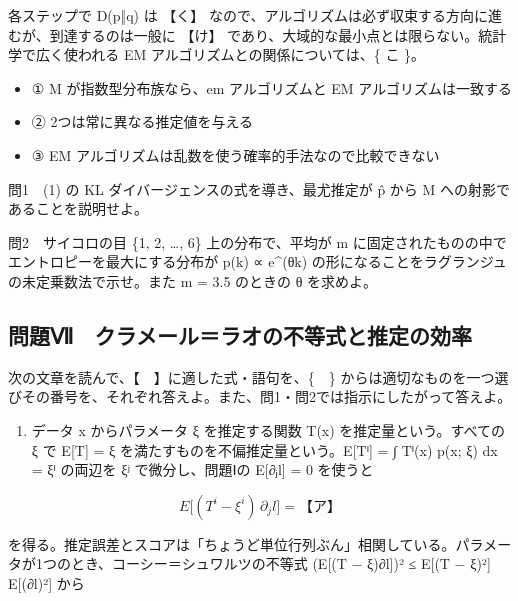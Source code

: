 \documentclass[
  10pt,
  a4paper,
]{article}
\providecommand{\tightlist}{%
  \setlength{\itemsep}{0pt}\setlength{\parskip}{0pt}}
\begin{document}
各ステップで D(p‖q) は 【く】
なので、アルゴリズムは必ず収束する方向に進むが、到達するのは一般に
【け】 であり、大域的な最小点とは限らない。統計学で広く使われる EM
アルゴリズムとの関係については、\{ こ \}。

\begin{itemize}
\tightlist
\item
  ① M が指数型分布族なら、em アルゴリズムと EM アルゴリズムは一致する
\item
  ② 2つは常に異なる推定値を与える
\item
  ③ EM アルゴリズムは乱数を使う確率的手法なので比較できない
\end{itemize}

問1　(1) の KL ダイバージェンスの式を導き、最尤推定が {\fallbackfont p̂}
から M への射影であることを説明せよ。

問2　サイコロの目 \{1, 2, \ldots, 6\} 上の分布で、平均が m
に固定されたものの中でエントロピーを最大にする分布が p(k) ∝ e\^{}(θk)
の形になることをラグランジュの未定乗数法で示せ。また m = 3.5 のときの θ
を求めよ。

\hypertarget{ux554fux984cux2176-ux30afux30e9ux30e1ux30fcux30ebux30e9ux30aaux306eux4e0dux7b49ux5f0fux3068ux63a8ux5b9aux306eux52b9ux7387}{%
\subsection{問題Ⅶ　クラメール＝ラオの不等式と推定の効率}\label{ux554fux984cux2176-ux30afux30e9ux30e1ux30fcux30ebux30e9ux30aaux306eux4e0dux7b49ux5f0fux3068ux63a8ux5b9aux306eux52b9ux7387}}

次の文章を読んで、【　】に適した式・語句を、\{　\}
からは適切なものを一つ選びその番号を、それぞれ答えよ。また、問1・問2では指示にしたがって答えよ。

\begin{enumerate}
\def\labelenumi{(\arabic{enumi})}
\tightlist
\item
  データ x からパラメータ ξ を推定する関数 T(x) を推定量という。すべての
  ξ で E{[}T{]} = ξ
  を満たすものを不偏推定量という。E{[}T{\fallbackfont ⁱ}{]} = ∫
  T{\fallbackfont ⁱ}(x) p(x; ξ) dx = ξ{\fallbackfont ⁱ} の両辺を
  ξ{\fallbackfont ʲ} で微分し、問題Ⅰの E{[}∂{\fallbackfont ⱼ}l{]} = 0
  を使うと
\end{enumerate}

\[E\big[ (T^i - \xi^i)\, \partial_j l \big] = \text{【ア】}\]

を得る。推定誤差とスコアは「ちょうど単位行列ぶん」相関している。パラメータが1つのとき、コーシー＝シュワルツの不等式
(E{[}(T − ξ)∂l{]})² ≤ E{[}(T − ξ)²{]} E{[}(∂l)²{]} から
\end{document}
